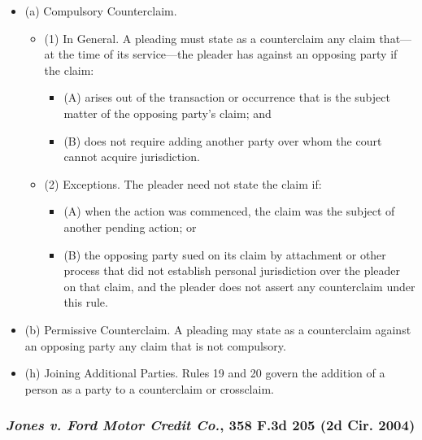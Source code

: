 \documentclass[11pt,letterpaper,twoside]{article}
\providecommand{\tightlist}{%
\setlength{\itemsep}{0em}\setlength{\parskip}{0em}\setlength{\itemindent}{0em}}
\begin{document}
\begin{itemize}
\tightlist
\item
  (a) Compulsory Counterclaim.

  \begin{itemize}
  \tightlist
  \item
    (1) In General. A pleading must state as a counterclaim any claim
    that---at the time of its service---the pleader has against an
    opposing party if the claim:

    \begin{itemize}
    \tightlist
    \item
      (A) arises out of the transaction or occurrence that is the
      subject matter of the opposing party's claim; and
    \item
      (B) does not require adding another party over whom the court
      cannot acquire jurisdiction.
    \end{itemize}
  \item
    (2) Exceptions. The pleader need not state the claim if:

    \begin{itemize}
    \tightlist
    \item
      (A) when the action was commenced, the claim was the subject of
      another pending action; or
    \item
      (B) the opposing party sued on its claim by attachment or other
      process that did not establish personal jurisdiction over the
      pleader on that claim, and the pleader does not assert any
      counterclaim under this rule.
    \end{itemize}
  \end{itemize}
\item
  (b) Permissive Counterclaim. A pleading may state as a counterclaim
  against an opposing party any claim that is not compulsory.
\item
  (h) Joining Additional Parties. Rules 19 and 20 govern the addition of
  a person as a party to a counterclaim or crossclaim.
\end{itemize}

\subsubsection{\texorpdfstring{\emph{Jones v. Ford Motor Credit Co.},
358 F.3d 205 (2d Cir.
2004)}{Jones v. Ford Motor Credit Co., 358 F.3d 205 (2d Cir. 2004)}}\label{jonesfordmotorcredit_2dcir2004}
\end{document}
